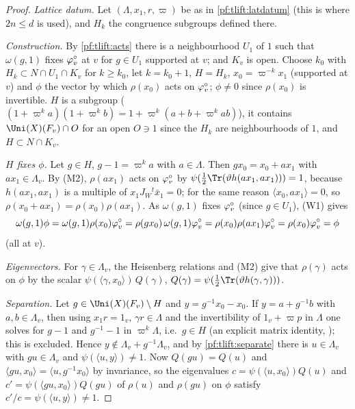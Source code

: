 \begin{proof}
\emph{Lattice datum.} Let $(\Lambda,x_1,r,\varpi)$ be as in \cref{pf:tlift:latdatum} (this is where $2n\le d$ is used), and $H_k$ the
congruence subgroups defined there.

\emph{Construction.} By \cref{pf:tlift:acts} there is a neighbourhood $U_1$ of $1$ such that $\omega(g,1)$ fixes
$\varphi^{\circ}_v$ at $v$ for $g\in U_1$ supported at $v$; and $K_v$ is open. Choose $k_0$ with $H_k\subset N\cap U_1\cap K_v$ for
$k\ge k_0$, let $k=k_0+1$, $H=H_k$, $x_0=\varpi^{-k}x_1$ (supported at $v$) and $\phi$ the vector by which $\rho(x_0)$ acts
on $\varphi^{\circ}_v$; $\phi\ne0$ since $\rho(x_0)$ is invertible. $H$ is a subgroup ($(1+\varpi^ka)(1+\varpi^kb)=1+\varpi^k(a+b+\varpi^kab)$), it
contains $\Uni(X)(F_v)\cap O$ for an open $O\ni1$ since the $H_k$ are neighbourhoods of $1$, and $H\subset N\cap K_v$.

\emph{$H$ fixes $\phi$.} Let $g\in H$, $g-1=\varpi^ka$ with $a\in\Lambda$. Then $gx_0=x_0+ax_1$ with $ax_1\in\Lambda_v$. By (M2),
$\rho(ax_1)$ acts on $\varphi^{\circ}_v$ by $\psi(\frac12\Tr(\vartheta h(ax_1,ax_1)))=1$, because $h(ax_1,ax_1)$ is a multiple of
$x_1J_W{}^t\bar x_1=0$; for the same reason $\langle x_0,ax_1\rangle=0$, so $\rho(x_0+ax_1)=\rho(x_0)\rho(ax_1)$. As $\omega(g,1)$
fixes $\varphi^{\circ}_v$ (since $g\in U_1$), (W1) gives
\[
  \omega(g,1)\phi=\omega(g,1)\rho(x_0)\varphi^{\circ}_v=\rho(gx_0)\,\omega(g,1)\varphi^{\circ}_v=\rho(x_0)\rho(ax_1)\varphi^{\circ}_v=\rho(x_0)\varphi^{\circ}_v=\phi
\]
(all at $v$).

\emph{Eigenvectors.} For $\gamma\in\Lambda_v$, the Heisenberg relations and (M2) give that $\rho(\gamma)$ acts on $\phi$ by the
scalar $\psi(\langle\gamma,x_0\rangle)\,Q(\gamma)$, $Q(\gamma)=\psi(\frac12\Tr(\vartheta h(\gamma,\gamma)))$.

\emph{Separation.} Let $g\in\Uni(X)(F_v)\setminus H$ and $y=g^{-1}x_0-x_0$. If $y=a+g^{-1}b$ with $a,b\in\Lambda_v$, then using
$x_1r=1_v$, $\gamma r\in\Lambda$ and the invertibility of $1_v+\varpi p$ in $\Lambda$ one solves for $g-1$ and $g^{-1}-1$ in $\varpi^k\Lambda$,
i.e.\ $g\in H$ (an explicit matrix identity, ); this is excluded. Hence
$y\notin\Lambda_v+g^{-1}\Lambda_v$, and by \cref{pf:tlift:separate} there is $u\in\Lambda_v$ with $gu\in\Lambda_v$ and $\psi(\langle u,y\rangle)\ne1$.
Now $Q(gu)=Q(u)$ and
$\langle gu,x_0\rangle=\langle u,g^{-1}x_0\rangle$ by invariance, so the eigenvalues $c=\psi(\langle u,x_0\rangle)Q(u)$ and
$c'=\psi(\langle gu,x_0\rangle)Q(gu)$ of $\rho(u)$ and $\rho(gu)$ on $\phi$ satisfy $c'/c=\psi(\langle u,y\rangle)\ne1$.
\end{proof}

